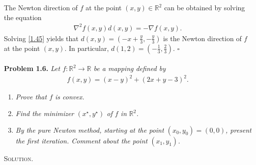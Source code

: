 \documentclass[a4paper]{article}
\numberwithin{equation}{section}
\begin{document}
The Newton direction of $f$ at the point $\left(x,y\right) \in \mathbb{R}^2$ can be obtained by solving the equation 
\begin{align}
\label{1.45}
{\nabla ^2}f\left( {x,y} \right)d\left( {x,y} \right) =  - \nabla f\left( {x,y} \right).
\end{align}
Solving \eqref{1.45} yields that $d\left( {x,y} \right) = \left( { - x + \frac{y}{3}, - \frac{y}{3}} \right)$ is the Newton direction of $f$ at the point $\left(x,y\right)$. In particular, $d\left( {1,2} \right) = \left( { - \frac{1}{3},\frac{2}{3}} \right)$. \hfill $\square$\\
\\
\textbf{Problem 1.6.} \textit{Let $f:\mathbb{R}^2\to \mathbb{R}$ be a mapping defined by}
\begin{align}
f\left( {x,y} \right) = {\left( {x - y} \right)^2} + {\left( {2x + y - 3} \right)^2}.
\end{align}
\begin{enumerate}
\item \textit{Prove that $f$ is convex.}
\item \textit{Find the minimizer $\left(x^\star,y^\star\right)$ of $f$ in $\mathbb{R}^2$.}
\item \textit{By the pure Newton method, starting at the point $\left(x_0,y_0\right)=\left(0,0\right)$, present the first iteration. Comment about the point $\left(x_1,y_1\right)$.}
\end{enumerate}
\textsc{Solution.}
\end{document}
